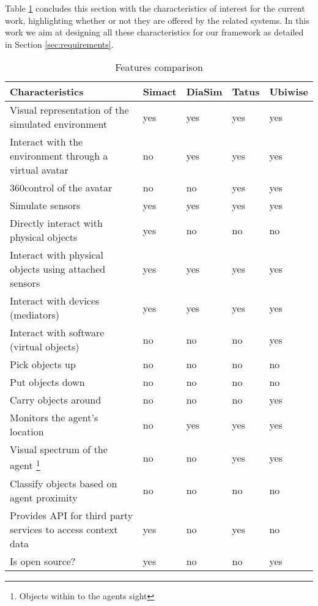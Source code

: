 
Table \ref{table:comparison} concludes this section with the characteristics of interest for the current work, highlighting whether or not they are offered by the related systems. In this work we aim at designing all these characteristics for our framework as detailed in Section \ref{sec:requirements}.

\begin{table}[H]
	\begin{center}
		\small \begin{tabular*}{1.1\columnwidth}{p{6.5cm}llll}
			\\ \hline \hline
			Characteristics & Simact & DiaSim & Tatus & Ubiwise \\ \hline \hline

			Visual representation of the simulated environment & yes & yes & yes & yes \\ \hline
			Interact with the environment through a virtual avatar & no & yes & yes & yes \\ \hline
			360\textdegree control of the avatar & no & no & yes & yes \\ \hline
			Simulate sensors & yes & yes & yes & yes \\ \hline
			Directly interact with physical objects & yes & no & no & no \\ \hline
			Interact with physical objects using attached sensors & yes & yes & yes & yes \\ \hline
			Interact with devices (mediators) & yes & yes & yes & yes \\ \hline
			Interact with software (virtual objects) & no & no & no & yes \\ \hline
			Pick objects up & no & no & no & no \\ \hline
			Put objects down & no & no & no & no \\ \hline
			Carry objects around & no & no & no & yes \\ \hline
			Monitors the agent's location & no & yes & yes & yes \\ \hline
			Visual spectrum of the agent \footnote{Objects within to the agents sight} & no & no & yes & yes \\ \hline
			Classify objects based on agent proximity & no & no & no & no \\ \hline
		 	Provides API for third party services to access context data & yes & no & yes & no \\ \hline
		 	Is open source? & yes & no & no & yes \\ \hline
		\end{tabular*}
		
		\caption{Features comparison}
		\label{table:comparison}
	\end{center}
\end{table}

